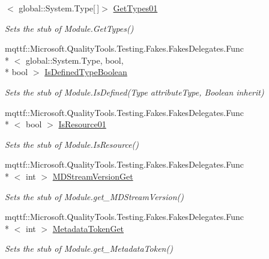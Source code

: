 \begin{DoxyCompactItemize}
$<$ global\-::\-System.\-Type\mbox{[}$\,$\mbox{]}$>$ \hyperlink{class_system_1_1_reflection_1_1_fakes_1_1_stub_module_aa6220dd819c4591787d52e29d2519939}{Get\-Types01}
\begin{DoxyCompactList}\small\item\em Sets the stub of Module.\-Get\-Types()\end{DoxyCompactList}\item 
mqttf\-::\-Microsoft.\-Quality\-Tools.\-Testing.\-Fakes.\-Fakes\-Delegates.\-Func\\*
$<$ global\-::\-System.\-Type, bool, \\*
bool $>$ \hyperlink{class_system_1_1_reflection_1_1_fakes_1_1_stub_module_a1b62da188199653b3ddbded756f280df}{Is\-Defined\-Type\-Boolean}
\begin{DoxyCompactList}\small\item\em Sets the stub of Module.\-Is\-Defined(\-Type attribute\-Type, Boolean inherit)\end{DoxyCompactList}\item 
mqttf\-::\-Microsoft.\-Quality\-Tools.\-Testing.\-Fakes.\-Fakes\-Delegates.\-Func\\*
$<$ bool $>$ \hyperlink{class_system_1_1_reflection_1_1_fakes_1_1_stub_module_a6334f711df96b389cd70023b438b4654}{Is\-Resource01}
\begin{DoxyCompactList}\small\item\em Sets the stub of Module.\-Is\-Resource()\end{DoxyCompactList}\item 
mqttf\-::\-Microsoft.\-Quality\-Tools.\-Testing.\-Fakes.\-Fakes\-Delegates.\-Func\\*
$<$ int $>$ \hyperlink{class_system_1_1_reflection_1_1_fakes_1_1_stub_module_ae04f373ebce1c4637f398cfb04b3b754}{M\-D\-Stream\-Version\-Get}
\begin{DoxyCompactList}\small\item\em Sets the stub of Module.\-get\-\_\-\-M\-D\-Stream\-Version()\end{DoxyCompactList}\item 
mqttf\-::\-Microsoft.\-Quality\-Tools.\-Testing.\-Fakes.\-Fakes\-Delegates.\-Func\\*
$<$ int $>$ \hyperlink{class_system_1_1_reflection_1_1_fakes_1_1_stub_module_ac7709e6ea6772ec4ecf044e8ecd47213}{Metadata\-Token\-Get}
\begin{DoxyCompactList}\small\item\em Sets the stub of Module.\-get\-\_\-\-Metadata\-Token()\end{DoxyCompactList}\item 

\end{DoxyCompactItemize}
